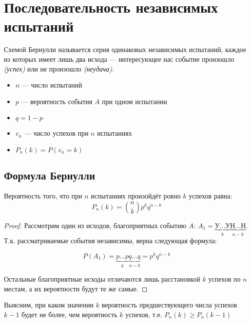 \documentclass[12pt, a4paper, oneside]{book}
\begin{document}
\section{Последовательность независимых испытаний}

\begin{definition}
    Схемой Бернулли называется серия одинаковых независимых испытаний, каждое из которых имеет лишь два исхода --- интересующее нас событие произошло \textit{(успех)} или не произошло \textit{(неудача)}.
\end{definition}

\begin{obozn}\itemfix
    \begin{itemize}
        \item \(n\) --- число испытаний
        \item \(p\) --- вероятность события \(A\) при одном испытании
        \item \(q = 1 - p\)
        \item \(v_n\) --- число успехов при \(n\) испытаниях
        \item \(P_n(k) = P(v_n = k)\)
    \end{itemize}
\end{obozn}

\subsection{Формула Бернулли}

\begin{theorem}
    Вероятность того, что при \(n\) испытаниях произойдёт ровно \(k\) успехов равна:
    \[P_n(k) = \binom{n}{k} p^k q^{n - k}\]
\end{theorem}
\begin{proof}
    Рассмотрим один из исходов, благоприятных событию \(A\): \(A_1 = \underbrace{\text{У} \dots \text{У}}_{k} \underbrace{\text{Н} \dots \text{Н}}_{n-k}\). Т.к. рассматриваемые события независимы, верна следующая формула:

    \[P(A_1) = \underbrace{p \dots p}_{k} \underbrace{q \dots q}_{n - k} = p^k q^{n - k}\]

    Остальные благоприятные исходы отличаются лишь расстановкой \(k\) успехов по \(n\) местам, а их вероятности будут те же самые.
\end{proof}

Выясним, при каком значении \(k\) вероятность предшествующего числа успехов \(k - 1\) будет не более, чем вероятность \(k\) успехов, т.е. \(P_n(k) \geq P_n(k - 1)\)
\end{document}
